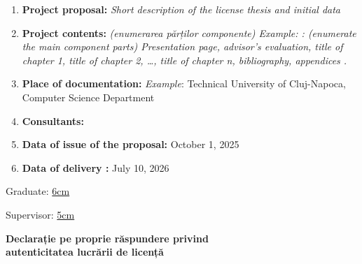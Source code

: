\vspace{5mm}

\begin{enumerate}
	\item {\bf Project proposal:} {\it Short description of the license thesis  and initial data}
	\item {\bf Project contents:} {\it (enumerarea părților componente) Example: : (enumerate the main component parts) Presentation page, advisor's evaluation, title of chapter 1, title of chapter 2, …, title of chapter n, bibliography, appendices .}
	\item {\bf Place of documentation:} {\it Example}: Technical University of Cluj-Napoca, Computer Science Department
	\item {\bf Consultants:}
	\item {\bf Data of issue of the proposal:} October 1, 2025 %
	\item {\bf Data of delivery :} July 10, 2026 %
\end{enumerate}
\vspace{1.2cm}

\hspace{6cm} Graduate: \uline{6cm}

\vspace{0.5cm}
\hspace{6cm} Supervisor: \uline{5cm}
\newpage
\begin{center}
	{\department}
\end{center}
\vspace{1cm}
\begin{center}
	{\bf Declarație pe proprie răspundere privind\\
		autenticitatea lucrării de licență}
\end{center}
\vspace{1cm}


